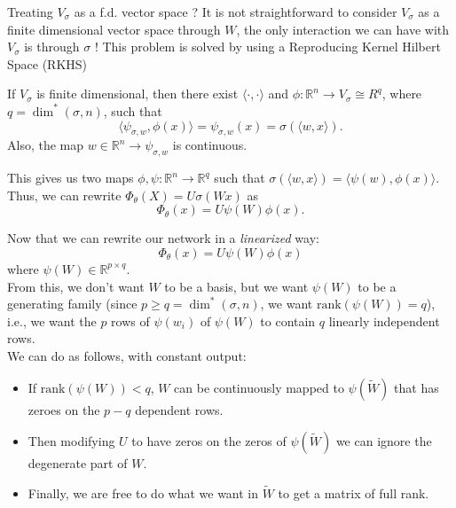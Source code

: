\documentclass{beamer}
\begin{document}
\begin{frame}{Treating $V_\sigma$ as a f.d. vector space ?}
	 It is not straightforward to consider $V_\sigma$ as a finite dimensional vector space through $W$, the only interaction we can have with $V_\sigma$ is through $\sigma$ !
	This problem is solved by using a Reproducing Kernel Hilbert Space (RKHS)
	\begin{lemma}
		If $V_\sigma$ is finite dimensional, then there exist $\langle \cdot, \cdot\rangle$ and $\phi :\mathbb{R}^n\to V_\sigma \cong R^q$, where $q=\dim^*(\sigma, n)$, such that 
		\begin{equation*}
			\langle \psi_{\sigma, w}, \phi(x)\rangle = \psi_{\sigma, w}(x) = \sigma(\langle w, x\rangle).
		\end{equation*}
		Also, the map $w\in\mathbb{R}^n\to \psi_{\sigma, w}$ is continuous.
	\end{lemma}
	This gives us two maps $\phi, \psi:\mathbb{R}^n\to\mathbb{R}^q$ such that $\sigma(\langle w, x\rangle) = \langle \psi(w), \phi(x)\rangle$.
	Thus, we can rewrite $\Phi_\theta(X) = U\sigma(Wx)$ as
	\begin{equation*}
		\Phi_\theta(x) = U\psi(W)\phi(x).
	\end{equation*}
\end{frame}

\begin{frame}
	Now that we can rewrite our network in a \emph{linearized} way:
	\begin{equation*}
		\Phi_\theta(x) = U\psi(W)\phi(x)
	\end{equation*}	
	where $\psi(W)\in\mathbb{R}^{p\times q}$.\\
	From this, we don't want $W$ to be a basis, but we want $\psi(W)$ to be a generating family (since  $p\geq q= \dim^*(\sigma, n)$, we want $\text{rank}(\psi(W)) = q$), i.e., we want the $p$ rows of $\psi(w_i)$ of $\psi(W)$ to contain $q$ linearly independent rows.\\
	We can do as follows, with constant output:
	\begin{itemize}
		\item If $\text{rank}(\psi(W)) < q$, $W$ can be continuously mapped to $\psi(\tilde W)$ that has zeroes on the $p-q$ dependent rows.
		\item Then modifying $U$ to have zeros on the zeros of $\psi(\tilde W)$ we can ignore the degenerate part of $W$.
		\item Finally, we are free to do what we want in $\tilde W$ to get a matrix of full rank.
	\end{itemize}
	
\end{frame}
\end{document}
